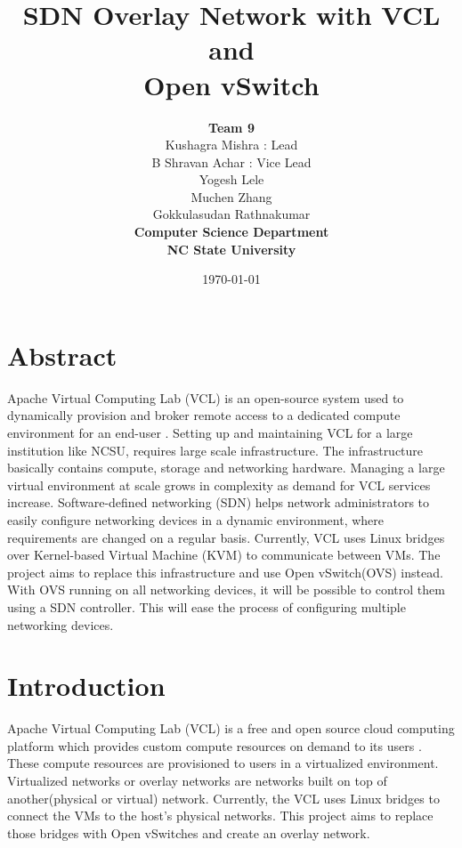 \documentclass[12pt]{extarticle}
\title{\textbf{SDN Overlay Network with VCL and \\Open vSwitch}}
\date{\today}
\author{\textbf{Team 9} \\Kushagra Mishra : Lead\\
B Shravan Achar : Vice Lead \\ Yogesh Lele \\ Muchen Zhang \\ Gokkulasudan Rathnakumar\\ \textbf{Computer Science Department} \\\textbf{NC State University}}
\begin{document}
\maketitle
\pagebreak

\newpage         

\section{Abstract}
Apache Virtual Computing Lab (VCL) is an open-source system used to dynamically provision and broker remote access to a dedicated compute environment for an end-user \cite{vcl}\cite{schaffer2009ncsu}. Setting up and maintaining VCL for a large institution like NCSU, requires large scale infrastructure. The infrastructure basically contains compute, storage and networking hardware. Managing a large virtual environment at scale grows in complexity as demand for VCL services increase. Software-defined networking (SDN) helps network administrators to easily configure networking devices in a dynamic environment, where requirements are changed on a regular basis. Currently, VCL uses Linux bridges over Kernel-based Virtual Machine (KVM) to communicate between VMs. The project aims to replace this infrastructure and use Open vSwitch(OVS) instead. With OVS running on all networking devices, it will be possible to control them using a SDN controller. This will ease the process of configuring multiple networking devices.

\pagebreak
\tableofcontents
\pagebreak
\listoffigures
\listoftables
\pagebreak

\section{Introduction}
Apache Virtual Computing Lab (VCL) is a free and open source cloud computing platform which provides custom compute resources on demand to its users \cite{vcl}\cite{schaffer2009ncsu}. These compute resources are provisioned to users in a virtualized environment. Virtualized networks or overlay networks are networks built on top of another(physical or virtual) network. Currently, the VCL uses Linux bridges to connect the VMs to the host’s physical networks. This project aims to replace those bridges with Open vSwitches and create an overlay network.
\end{document}

